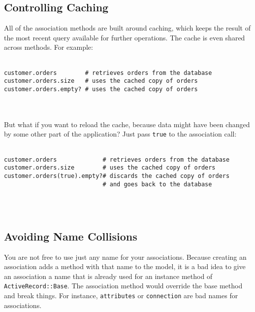 \documentclass[10pt]{book}
\begin{document}
\subsection{ Controlling Caching}

All of the association methods are built around caching, which keeps  the result of the most recent query available for further operations.  The cache is even shared across methods. For example:
\\ \\
\begin{minipage}{\textwidth}{\scriptsize
\begin{verbatim}
customer.orders        # retrieves orders from the database
customer.orders.size   # uses the cached copy of orders
customer.orders.empty? # uses the cached copy of orders
\end{verbatim}}
\end{minipage}
\\ \\

But what if you want to reload the cache, because data might have been changed by some other part of the application? Just pass \texttt{true} to the association call:
\\ \\
\begin{minipage}{\textwidth}{\scriptsize
\begin{verbatim}
customer.orders             # retrieves orders from the database
customer.orders.size        # uses the cached copy of orders
customer.orders(true).empty?# discards the cached copy of orders
                            # and goes back to the database
\end{verbatim}}
\end{minipage}
\\ \\

\subsection{ Avoiding Name Collisions}

You are not free to use just any name for your associations. Because  creating an association adds a method with that name to the model, it is  a bad idea to give an association a name that is already used for an  instance method of \texttt{ActiveRecord::Base}. The association method would override the base method and break things. For instance, \texttt{attributes} or \texttt{connection} are bad names for associations.
\end{document}
